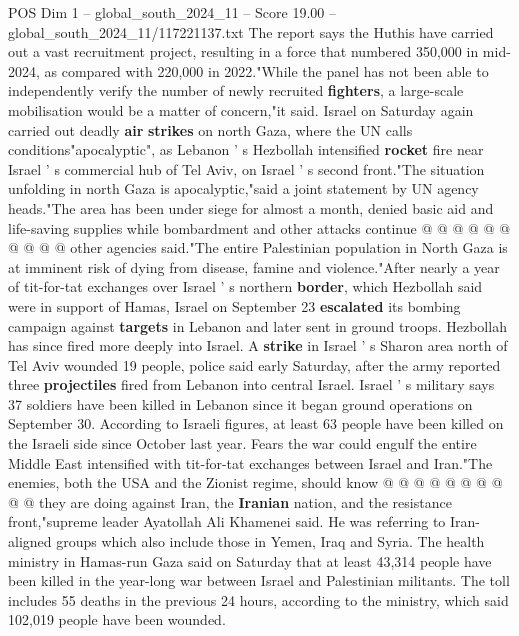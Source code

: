 \begin{textsample}{POS Dim 1 – global\_south\_2024\_11 – Score 19.00 – global\_south\_2024\_11/117221137.txt}
The report says the Huthis have carried out a vast recruitment project, resulting in a force that numbered 350,000 in mid-2024, as compared with 220,000 in 2022."While the panel has not been able to independently verify the number of newly recruited \textbf{fighters}, a large-scale mobilisation would be a matter of concern,"it said.
Israel on Saturday again carried out deadly \textbf{air} \textbf{strikes} on north Gaza, where the UN calls conditions"apocalyptic", as Lebanon ' s Hezbollah intensified \textbf{rocket} fire near Israel ' s commercial hub of Tel Aviv, on Israel ' s second front."The situation unfolding in north Gaza is apocalyptic,"said a joint statement by UN agency heads."The area has been under siege for almost a month, denied basic aid and life-saving supplies while bombardment and other attacks continue @ @ @ @ @ @ @ @ @ @ other agencies said."The entire Palestinian population in North Gaza is at imminent risk of dying from disease, famine and violence."After nearly a year of tit-for-tat exchanges over Israel ' s northern \textbf{border}, which Hezbollah said were in support of Hamas, Israel on September 23 \textbf{escalated} its bombing campaign against \textbf{targets} in Lebanon and later sent in ground troops.
Hezbollah has since fired more deeply into Israel.
A \textbf{strike} in Israel ' s Sharon area north of Tel Aviv wounded 19 people, police said early Saturday, after the army reported three \textbf{projectiles} fired from Lebanon into central Israel.
Israel ' s military says 37 soldiers have been killed in Lebanon since it began ground operations on September 30.
According to Israeli figures, at least 63 people have been killed on the Israeli side since October last year.
Fears the war could engulf the entire Middle East intensified with tit-for-tat exchanges between Israel and Iran."The enemies, both the USA and the Zionist regime, should know @ @ @ @ @ @ @ @ @ @ they are doing against Iran, the \textbf{Iranian} nation, and the resistance front,"supreme leader Ayatollah Ali Khamenei said.
He was referring to Iran-aligned groups which also include those in Yemen, Iraq and Syria.
The health ministry in Hamas-run Gaza said on Saturday that at least 43,314 people have been killed in the year-long war between Israel and Palestinian militants.
The toll includes 55 deaths in the previous 24 hours, according to the ministry, which said 102,019 people have been wounded.

\end{textsample}
